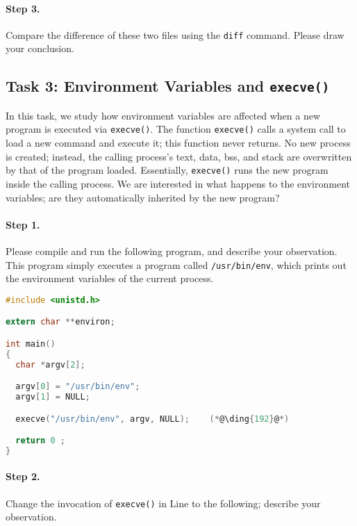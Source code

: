 \paragraph{Step 3.} Compare the difference of these two files using
the {\tt diff} command. Please draw your conclusion.



\subsection{Task 3: Environment Variables and {\tt execve()}}

In this task, we study how environment variables are affected
when a new program is
executed via {\tt execve()}. The
function {\tt execve()} calls a system call to load
a new command and execute it; this function never returns.
No new process is created; instead, the calling
process's text,  data, bss, and stack  are overwritten by that of
the program loaded. Essentially, {\tt execve()} runs the new program inside
the calling process. We are interested in what happens to the
environment variables; are they automatically inherited by the
new program?


\paragraph{Step 1.} Please compile and run the following
program, and describe your observation. This program simply executes
a program called {\tt /usr/bin/env}, which prints out the environment
variables of the current process.

\begin{lstlisting}[language=C]
#include <unistd.h>

extern char **environ;

int main()
{
  char *argv[2];

  argv[0] = "/usr/bin/env";
  argv[1] = NULL;

  execve("/usr/bin/env", argv, NULL);    (*@\ding{192}@*)

  return 0 ;
}
\end{lstlisting}


\paragraph{Step 2.} Change the invocation of {\tt execve()}
in Line  to the following; describe your observation.



